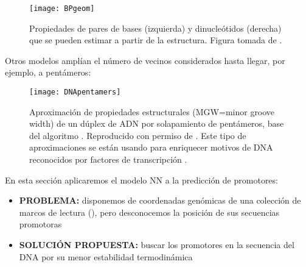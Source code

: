 \begin{figure}
\begin{center} 
\texttt{[image: BPgeom]}
\caption
{
Propiedades de pares de bases (izquierda) y dinucle\'{o}tidos (derecha) que se pueden estimar a partir de la estructura. 
Figura tomada de .
}
\label{fig:BPgeometry}
\end{center}
\end{figure}




Otros modelos ampl\'{i}an el n\'{u}mero de vecinos considerados hasta llegar, por ejemplo, a pent\'{a}meros:

\begin{figure}
\begin{center} 
\texttt{[image: DNApentamers]}
\caption
{
Aproximaci\'{o}n de propiedades estructurales (MGW=minor groove width) de un d\'{u}plex de ADN por solapamiento de pent\'{a}meros, 
base del algoritmo . 
Reproducido con permiso de \citet{Zhou2013}.
Este tipo de aproximaciones se est\'{a}n usando para enriquecer motivos de DNA reconocidos por factores de transcripci\'{o}n \citep{Yang2015}.
}
\label{fig:NN5}
\end{center}
\end{figure}

En esta secci\'{o}n aplicaremos el modelo NN a la predicci\'{o}n de promotores:

\begin{itemize}
\item \textbf{PROBLEMA:} disponemos de coordenadas gen\'{o}micas de una colecci\'{o}n de marcos de lectura 
(), 
pero desconocemos la posici\'{o}n de sus secuencias promotoras
\item \textbf{SOLUCI\'{O}N PROPUESTA:} buscar los promotores en la secuencia del DNA por su menor estabilidad termodin\'{a}mica
\end{itemize}

